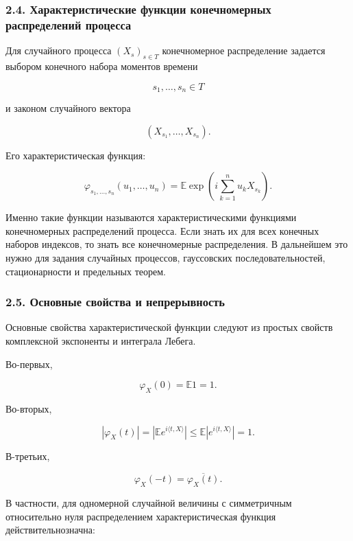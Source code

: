 \documentclass[
  11pt,
  a4paper,
]{article}
\begin{document}
\subsubsection{2.4. Характеристические функции конечномерных
распределений
процесса}\label{ux445ux430ux440ux430ux43aux442ux435ux440ux438ux441ux442ux438ux447ux435ux441ux43aux438ux435-ux444ux443ux43dux43aux446ux438ux438-ux43aux43eux43dux435ux447ux43dux43eux43cux435ux440ux43dux44bux445-ux440ux430ux441ux43fux440ux435ux434ux435ux43bux435ux43dux438ux439-ux43fux440ux43eux446ux435ux441ux441ux430}

Для случайного процесса \((X_s)_{s\in T}\) конечномерное распределение
задается выбором конечного набора моментов времени

\[
s_1,\ldots,s_n\in T
\]

и законом случайного вектора

\[
(X_{s_1},\ldots,X_{s_n}).
\]

Его характеристическая функция:

\[
\varphi_{s_1,\ldots,s_n}(u_1,\ldots,u_n)
=
\mathbb E\exp\left(i\sum_{k=1}^n u_kX_{s_k}\right).
\]

Именно такие функции называются характеристическими функциями
конечномерных распределений процесса. Если знать их для всех конечных
наборов индексов, то знать все конечномерные распределения. В дальнейшем
это нужно для задания случайных процессов, гауссовских
последовательностей, стационарности и предельных теорем.

\subsubsection{2.5. Основные свойства и
непрерывность}\label{ux43eux441ux43dux43eux432ux43dux44bux435-ux441ux432ux43eux439ux441ux442ux432ux430-ux438-ux43dux435ux43fux440ux435ux440ux44bux432ux43dux43eux441ux442ux44c}

Основные свойства характеристической функции следуют из простых свойств
комплексной экспоненты и интеграла Лебега.

Во-первых,

\[
\varphi_X(0)=\mathbb E1=1.
\]

Во-вторых,

\[
|\varphi_X(t)|
=|\mathbb E e^{i\langle t,X\rangle}|
\le \mathbb E |e^{i\langle t,X\rangle}|
=1.
\]

В-третьих,

\[
\varphi_X(-t)=\overline{\varphi_X(t)}.
\]

В частности, для одномерной случайной величины с симметричным
относительно нуля распределением характеристическая функция
действительнозначна:
\end{document}
